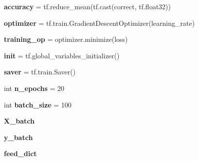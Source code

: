 \begin{DoxyCompactItemize}
{\bfseries accuracy} = tf.\+reduce\+\_\+mean(tf.\+cast(correct, tf.\+float32))
\item 
\mbox{\label{namespacechemistry2quant_1_1chem2quant__NN_af457ddc7b0e03be335894a03077fd8b7}} 
{\bfseries optimizer} = tf.\+train.\+Gradient\+Descent\+Optimizer(learning\+\_\+rate)
\item 
\mbox{\label{namespacechemistry2quant_1_1chem2quant__NN_acba1c26abce105144e8f0d60a1068c79}} 
{\bfseries training\+\_\+op} = optimizer.\+minimize(loss)
\item 
\mbox{\label{namespacechemistry2quant_1_1chem2quant__NN_ae4aff91e0d7af103eaaef10b18075253}} 
{\bfseries init} = tf.\+global\+\_\+variables\+\_\+initializer()
\item 
\mbox{\label{namespacechemistry2quant_1_1chem2quant__NN_a70d2c6378062ed0ad4bde95cebafd57d}} 
{\bfseries saver} = tf.\+train.\+Saver()
\item 
\mbox{\label{namespacechemistry2quant_1_1chem2quant__NN_a83b2d2aff8b2b1a37c2d97ae7aa35ba1}} 
int {\bfseries n\+\_\+epochs} = 20
\item 
\mbox{\label{namespacechemistry2quant_1_1chem2quant__NN_afcd6b36a19d229a0b649ea567b898156}} 
int {\bfseries batch\+\_\+size} = 100
\item 
\mbox{\label{namespacechemistry2quant_1_1chem2quant__NN_ade7be0b947adc0fefec69bbd6075f27f}} 
{\bfseries X\+\_\+batch}
\item 
\mbox{\label{namespacechemistry2quant_1_1chem2quant__NN_a43d2f31fbb7c1ebc130e3e600484529d}} 
{\bfseries y\+\_\+batch}
\item 
\mbox{\label{namespacechemistry2quant_1_1chem2quant__NN_a63bedc3cdcc2284801b22869eee073de}} 
{\bfseries feed\+\_\+dict}
\item 
\mbox{\label{namespacechemistry2quant_1_1chem2quant__NN_a4a3a2f40fbba7b1aa0688e669b322f6f}} 

\end{DoxyCompactItemize}
